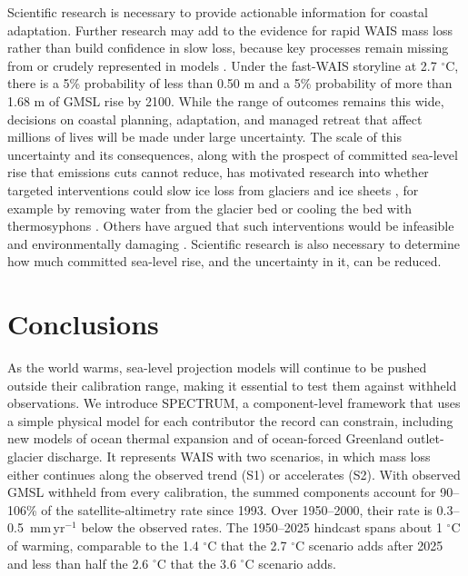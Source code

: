 \documentclass[draft,linenumbers]{agujournal2025}
\begin{document}
Scientific research is necessary to provide actionable information for coastal adaptation. Further research may add to the evidence for rapid WAIS mass loss rather than build confidence in slow loss, because key processes remain missing from or crudely represented in models \citep{Fricker2025,Millman2026}. Under the fast-WAIS storyline at 2.7 $^\circ$C, there is a 5\% probability of less than 0.50 m and a 5\% probability of more than 1.68 m of GMSL rise by 2100. While the range of outcomes remains this wide, decisions on coastal planning, adaptation, and managed retreat that affect millions of lives will be made under large uncertainty. The scale of this uncertainty and its consequences, along with the prospect of committed sea-level rise that emissions cuts cannot reduce, has motivated research into whether targeted interventions could slow ice loss from glaciers and ice sheets \citep{Wolovick2018,MacAyeal2024}, for example by removing water from the glacier bed \citep{Meyer2026} or cooling the bed with thermosyphons \citep{Miller2026}. Others have argued that such interventions would be infeasible and environmentally damaging \citep{Siegert2025}. Scientific research is also necessary to determine how much committed sea-level rise, and the uncertainty in it, can be reduced.


\section{Conclusions}


As the world warms, sea-level projection models will continue to be pushed outside their calibration range, making it essential to test them against withheld observations. We introduce SPECTRUM, a component-level framework that uses a simple physical model for each contributor the record can constrain, including new models of ocean thermal expansion and of ocean-forced Greenland outlet-glacier discharge. It represents WAIS with two scenarios, in which mass loss either continues along the observed trend (S1) or accelerates (S2). With observed GMSL withheld from every calibration, the summed components account for 90--106\% of the satellite-altimetry rate since 1993. Over 1950--2000, their rate is 0.3--0.5~mm\,yr$^{-1}$ below the observed rates. The 1950--2025 hindcast spans about 1 $^\circ$C of warming, comparable to the 1.4 $^\circ$C that the 2.7 $^\circ$C scenario adds after 2025 and less than half the 2.6 $^\circ$C that the 3.6 $^\circ$C scenario adds.
\end{document}
